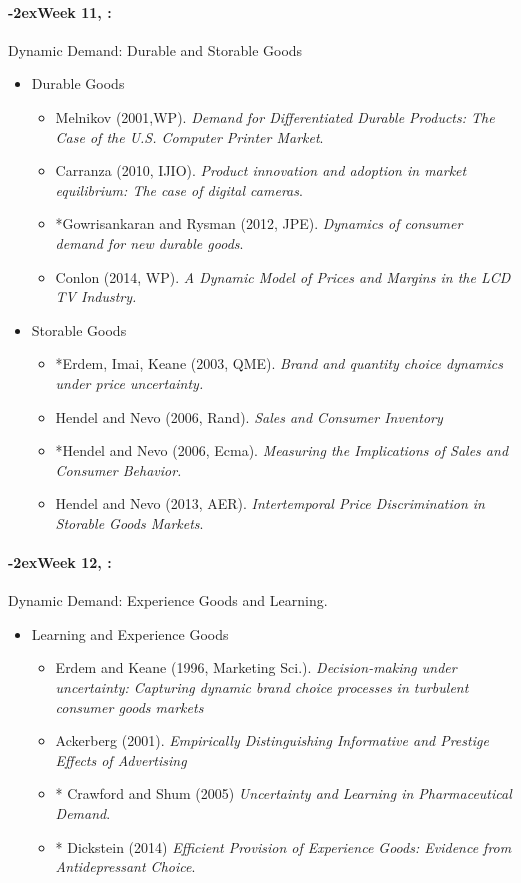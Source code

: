 \documentclass[11pt]{article}
\newcommand{\week}[1]{%
  \sbox{\weekdatebox}{\syldate{\today}}%
  \paragraph*{\kern-2ex\quad #1, \usebox{\weekdatebox}:}%
  \AdvanceDate[7]%
}
\begin{document}
\week{Week 11}  Dynamic Demand: Durable and Storable Goods
\begin{itemize}
\item Durable Goods
\begin{itemize}
\item Melnikov (2001,WP). \textit{Demand for Differentiated Durable Products: The Case of the U.S. Computer Printer Market}.
\item Carranza (2010, IJIO). \textit{Product innovation and adoption in market equilibrium: The case of digital cameras}.
\item *Gowrisankaran and Rysman (2012, JPE). \textit{Dynamics of consumer demand for new durable goods}.
\item Conlon (2014, WP). \textit{A Dynamic Model of Prices and Margins in the LCD TV Industry.}
\end{itemize}
\item Storable Goods
\begin{itemize}
\item *Erdem, Imai, Keane (2003, QME). \textit{Brand and quantity choice dynamics under price uncertainty.}
\item Hendel and Nevo (2006, Rand). \textit{Sales and Consumer Inventory}
\item *Hendel and Nevo (2006, Ecma). \textit{Measuring the Implications of Sales and Consumer Behavior.}
\item Hendel and Nevo (2013, AER). \textit{Intertemporal Price Discrimination in Storable Goods Markets}.
\end{itemize}
\end{itemize}

\week{Week 12} Dynamic Demand: Experience Goods and Learning.
\begin{itemize}
\item Learning and Experience Goods
\begin{itemize}
\item Erdem and Keane (1996, Marketing Sci.). \textit{Decision-making under uncertainty: Capturing dynamic brand choice processes in turbulent consumer goods markets}
\item Ackerberg (2001). \textit{Empirically Distinguishing Informative and Prestige Effects of Advertising}
\item * Crawford and Shum (2005) \textit{Uncertainty and Learning in Pharmaceutical Demand}.
\item * Dickstein (2014) \textit{Efficient Provision of Experience Goods: Evidence from Antidepressant Choice}.
\end{itemize}
\end{itemize}
\end{document}
